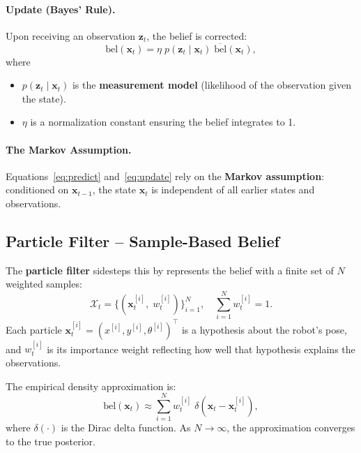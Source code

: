 \documentclass[12pt, a4paper]{article}
\begin{document}
\paragraph{Update (Bayes' Rule).}
Upon receiving an observation \(\mathbf{z}_t\), the belief is corrected:
\begin{equation}
  \text{bel}(\mathbf{x}_t)
    = \eta\; p(\mathbf{z}_t \mid \mathbf{x}_t)\;
      \overline{\text{bel}}(\mathbf{x}_t),
  \label{eq:update}
\end{equation}
where
\begin{itemize}[nosep]
  \item \(p(\mathbf{z}_t \mid \mathbf{x}_t)\) is the \textbf{measurement model} (likelihood of the observation given the state).
  \item \(\eta\) is a normalization constant ensuring the belief integrates to 1.
\end{itemize}

\paragraph{The Markov Assumption.}
Equations~\eqref{eq:predict} and~\eqref{eq:update} rely on the \textbf{Markov assumption}: conditioned on \(\mathbf{x}_{t-1}\), the state \(\mathbf{x}_t\) is independent of all earlier states and observations. 

\subsection{Particle Filter – Sample-Based Belief}
\label{subsec:pf}
 The \textbf{particle filter} sidesteps this by represents the belief with a finite set of \(N\) weighted samples:
\begin{equation}
  \mathcal{X}_t = \bigl\{(\mathbf{x}_t^{[i]},\; w_t^{[i]})\bigr\}_{i=1}^{N},
  \quad \sum_{i=1}^{N} w_t^{[i]} = 1.
  \label{eq:particle_set}
\end{equation}
Each particle \(\mathbf{x}_t^{[i]} = (x^{[i]}, y^{[i]}, \theta^{[i]})^\top\) is a hypothesis about the robot's pose, and \(w_t^{[i]}\) is its importance weight reflecting how well that hypothesis explains the observations.

The empirical density approximation is:
\begin{equation}
  \text{bel}(\mathbf{x}_t) \approx \sum_{i=1}^{N} w_t^{[i]}\; \delta(\mathbf{x}_t - \mathbf{x}_t^{[i]}),
  \label{eq:empirical}
\end{equation}
where \(\delta(\cdot)\) is the Dirac delta function.  As \(N \to \infty\), the approximation converges to the true posterior.
\end{document}
